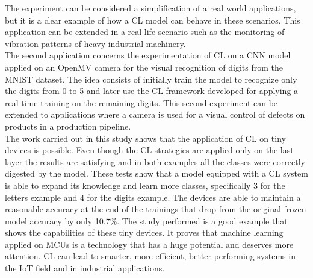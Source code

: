 \documentclass[12pt]{report}
\begin{document}
The experiment can be considered a simplification of a real world applications, but it is a clear example of how a CL model can behave in these scenarios. This application can be extended in a real-life scenario such as the monitoring of vibration patterns of heavy industrial machinery. \\
The second application concerns the experimentation of CL on a CNN model applied on an OpenMV camera for the visual recognition of digits from the MNIST dataset. The idea consists of initially train the model to recognize only the digits from 0 to 5 and later use the CL framework developed for applying a real time training on the remaining digits. This second experiment can be extended to applications where a camera is used for a visual control of defects on products in a production pipeline.  \\
The work carried out in this study shows that the application of CL on tiny devices is possible. Even though the CL strategies are applied only on the last layer the results are satisfying and in both examples all the classes were correctly digested by the model. These tests show that a model equipped with a CL system is able to expand its knowledge and learn more classes, specifically 3 for the letters example and 4 for the digits example. The devices are able to maintain a reasonable accuracy at the end of the trainings that drop from the original frozen model accuracy by only 10.7\%.
The study performed is a good example that shows the capabilities of these tiny devices. It proves that machine learning applied on MCUs is a technology that has a huge potential and deserves more attention. CL can lead to smarter, more efficient, better performing systems in the IoT field and in industrial applications.
\bigskip
\end{document}
